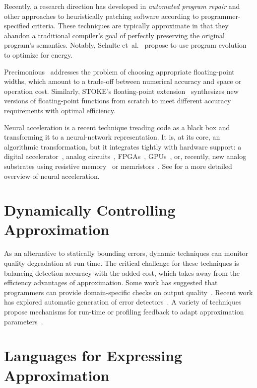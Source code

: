 Recently, a research direction has developed in \emph{automated program
repair} and other approaches to heuristically patching software according to
programmer-specified criteria.
These techniques are typically approximate in that they abandon a traditional
compiler's goal of perfectly preserving the original program's semantics.
Notably, Schulte et~al.~\cite{schulte} propose to use program evolution to
optimize for energy.

Precimonious~\cite{precimonious} addresses the problem of choosing appropriate
floating-point widths, which amount to a trade-off between numerical accuracy
and space or operation cost.
Similarly, STOKE's floating-point extension~\cite{stoke-fp} synthesizes new
versions of floating-point functions from scratch to meet different accuracy
requirements with optimal efficiency.

Neural acceleration is a recent technique treading code as a black box and
transforming it to a neural-network representation.
It is, at its core, an algorithmic transformation, but it integrates tightly
with hardware support: a digital accelerator~\cite{npu}, analog
circuits~\cite{anpu}, FPGAs~\cite{snnap},
GPUs~\cite{neuralgpu}, or, recently, new analog substrates using
resistive memory~\cite{rram-npu} or memristors~\cite{memristor-npu}.
See  for a more detailed overview of neural acceleration.


\section{Dynamically Controlling Approximation}

As an alternative to statically bounding errors, dynamic techniques can
monitor quality degradation at run time.
The critical challenge for these techniques is balancing detection accuracy
with the added cost, which takes away from the efficiency advantages of
approximation.
Some work has suggested that programmers can provide domain-specific checks on
output quality~\cite{lwc, approxdebug}.
Recent work has explored automatic generation of error detectors~\cite{rumba}.
A variety of techniques propose mechanisms for run-time or profiling feedback to adapt
approximation parameters~\cite{dynamicknobs, green, approxit, ansel-autotuning}.

\section{Languages for Expressing Approximation}

